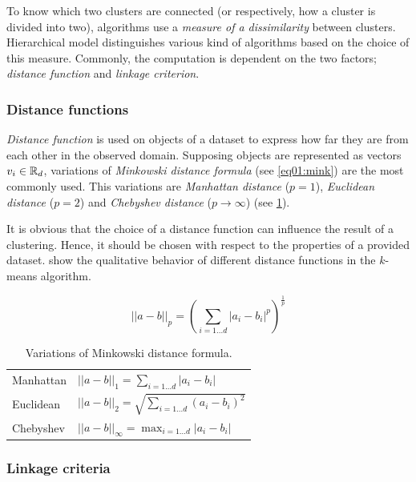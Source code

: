 To know which two clusters are connected (or respectively, how a cluster is divided into two), algorithms use a \emph{measure of a dissimilarity} between clusters.  
Hierarchical model distinguishes various kind of algorithms based on the choice of this measure. Commonly, the computation is dependent on the two factors; \emph{distance function} and \emph{linkage criterion}. 

\subsubsection{Distance functions}

\emph{Distance function} is used on objects of a dataset to express how far they are from each other in the observed domain. Supposing objects are represented as vectors $v_i \in \mathbb{R}_d$, variations of \emph{Minkowski distance formula} (see \ref{eq01:mink}) are the most commonly used.
This variations are \emph{Manhattan distance} ($p=1$), \emph{Euclidean distance} ($p=2$) and \emph{Chebyshev distance} ($p \to \infty$) (see \ref{tab01:mink}).

It is obvious that the choice of a distance function can influence the result of a clustering. Hence, it should be chosen with respect to the properties of a provided dataset. \citet{aggarwal2001surprising} show the qualitative behavior of different distance functions in the $k$-means algorithm.  

\begin{equation}\label{eq01:mink}
||a-b||_p = (\sum_{i=1...d}|a_i-b_i|^p)^{\frac{1}{p}}
\end{equation}

\begin{table}
	\centering
	\begin{tabular}{ll}
		\toprule
		Manhattan & $||a-b||_1 = \sum_{i=1...d}|a_i-b_i|$          \\
		Euclidean & $||a-b||_2 = \sqrt{\sum_{i=1...d}(a_i-b_i)^2}$ \\
		Chebyshev & $||a-b||_\infty = \max_{i=1\dots d}|a_i-b_i|$  \\ \bottomrule
	\end{tabular}
	\caption{Variations of Minkowski distance formula.}
	\label{tab01:mink}
\end{table}

\subsubsection{Linkage criteria}

